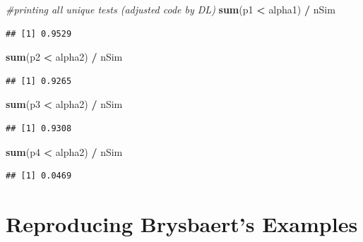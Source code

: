 \documentclass[]{book}
\newenvironment{Shaded}{\begin{snugshade}}{\end{snugshade}}
\newcommand{\CommentTok}[1]{\textcolor[rgb]{0.56,0.35,0.01}{\textit{#1}}}
\newcommand{\KeywordTok}[1]{\textcolor[rgb]{0.13,0.29,0.53}{\textbf{#1}}}
\newcommand{\NormalTok}[1]{#1}
\newcommand{\OperatorTok}[1]{\textcolor[rgb]{0.81,0.36,0.00}{\textbf{#1}}}
\newcommand{\StringTok}[1]{\textcolor[rgb]{0.31,0.60,0.02}{#1}}
\begin{document}
\begin{Shaded}
\begin{Highlighting}[]
\CommentTok{#printing all unique tests (adjusted code by DL)}
\KeywordTok{sum}\NormalTok{(p1 }\OperatorTok{<}\StringTok{ }\NormalTok{alpha1) }\OperatorTok{/}\StringTok{ }\NormalTok{nSim}
\end{Highlighting}
\end{Shaded}

\begin{verbatim}
## [1] 0.9529
\end{verbatim}

\begin{Shaded}
\begin{Highlighting}[]
\KeywordTok{sum}\NormalTok{(p2 }\OperatorTok{<}\StringTok{ }\NormalTok{alpha2) }\OperatorTok{/}\StringTok{ }\NormalTok{nSim}
\end{Highlighting}
\end{Shaded}

\begin{verbatim}
## [1] 0.9265
\end{verbatim}

\begin{Shaded}
\begin{Highlighting}[]
\KeywordTok{sum}\NormalTok{(p3 }\OperatorTok{<}\StringTok{ }\NormalTok{alpha2) }\OperatorTok{/}\StringTok{ }\NormalTok{nSim}
\end{Highlighting}
\end{Shaded}

\begin{verbatim}
## [1] 0.9308
\end{verbatim}

\begin{Shaded}
\begin{Highlighting}[]
\KeywordTok{sum}\NormalTok{(p4 }\OperatorTok{<}\StringTok{ }\NormalTok{alpha2) }\OperatorTok{/}\StringTok{ }\NormalTok{nSim}
\end{Highlighting}
\end{Shaded}

\begin{verbatim}
## [1] 0.0469
\end{verbatim}

\hypertarget{reproducing-brysbaerts-examples}{%
\section{Reproducing Brysbaert's Examples}\label{reproducing-brysbaerts-examples}}
\end{document}
